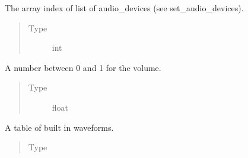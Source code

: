 \documentclass[letterpaper,10pt,english,openany,oneside]{sphinxmanual}
\begin{document}
\begin{fulllineitems}
\begin{fulllineitems}
\begin{quote}
\begin{description}
\end{description}\end{quote}

\end{fulllineitems}



\begin{fulllineitems}

\pysigstartsignatures
{}
\pysigstopsignatures
\sphinxAtStartPar
The array index of list of audio\_devices (see set\_audio\_devices).
\begin{quote}\begin{description}
\item[{Type}] \leavevmode
\sphinxAtStartPar
int

\end{description}\end{quote}

\end{fulllineitems}



\begin{fulllineitems}

\pysigstartsignatures
{}
\pysigstopsignatures
\sphinxAtStartPar
A number between 0 and 1 for the volume.
\begin{quote}\begin{description}
\item[{Type}] \leavevmode
\sphinxAtStartPar
float

\end{description}\end{quote}

\end{fulllineitems}



\begin{fulllineitems}

\pysigstartsignatures
{}
\pysigstopsignatures
\sphinxAtStartPar
A table of built in waveforms.
\begin{quote}\begin{description}
\item[{Type}] \leavevmode
\sphinxAtStartPar
{}

\end{description}\end{quote}

\end{fulllineitems}




\end{fulllineitems}
\end{document}
